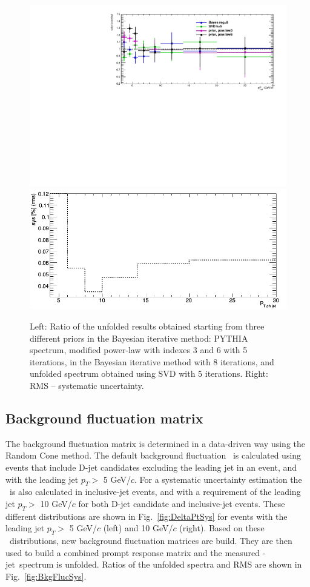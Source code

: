 \begin{figure}[bth]
\centering
\includegraphics[width=.45\textwidth]{pPbplots/unfolding/jetSpectraRatio_unfSys}
\includegraphics[width=.45\textwidth]{pPbplots/unfolding/jetSpectraSys_unfSys}
\caption{Left: Ratio of the unfolded results obtained starting from three different priors in the Bayesian iterative method: PYTHIA spectrum, modified power-law with indexes $3$ and $6$ with 5 iterations, in the Bayesian iterative method with 8 iterations, and unfolded spectrum obtained using SVD with 5 iterations. Right: RMS -- systematic uncertainty. }
\label{fig:unfcomparisonSys}
\end{figure}


\subsection{Background fluctuation matrix}

The background fluctuation matrix is determined in a data-driven way using the Random Cone method.
The default background fluctuation \deltapt\ is calculated using events that include D-jet candidates excluding the leading jet in an event, and with the leading jet $p_{T}>$ 5 GeV/$c$. For a systematic uncertainty estimation the \deltapt\ is also calculated in inclusive-jet events, and with a requirement of the leading jet $p_{T}>$ 10 GeV/$c$ for both D-jet candidate and inclusive-jet events.
These different distributions are shown in Fig.~\ref{fig:DeltaPtSys} for events with the leading jet $p_{T}>$ 5 GeV/$c$ (left) and 10 GeV/$c$ (right). Based on these \deltapt\ distributions, new background fluctuation matrices are build. They are then used to build a combined prompt response matrix and the measured \Dstar-jet\ \pt spectrum is unfolded. Ratios of the unfolded spectra and RMS are shown in Fig.~\ref{fig:BkgFlucSys}.
 
